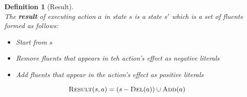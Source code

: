 \documentclass[12pt]{article}
\newtheorem{definition}{Definition}[section]
\theoremstyle{definition}
\begin{document}
\begin{definition}[Result]
\hfill\\\normalfont The \textbf{result} of executing action $a$ in state $s$ is a state $s'$ which is a set of fluents formed as follows:
\begin{itemize}
	\item Start from $s$
	\item Remove fluents that appears in teh action's effect as negative literals
	\item Add fluents that appear in the action's effect as positive literals
\end{itemize}
\[
\textsc{Result}(s,a) = (s-\textsc{Del}(a))\cup\textsc{Add}(a)
\]
\end{definition}
\end{document}
